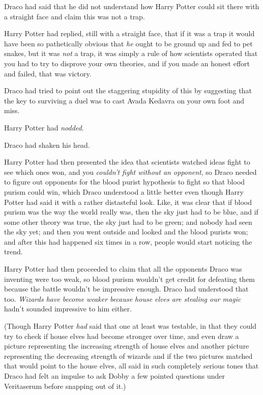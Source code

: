 Draco had said that he did not understand how Harry Potter could sit there with a straight face and claim this was not a trap.

Harry Potter had replied, still with a straight face, that if it was a trap it would have been so pathetically obvious that \emph{he} ought to be ground up and fed to pet snakes, but it was \emph{not} a trap, it was simply a rule of how scientists operated that you had to try to disprove your own theories, and if you made an honest effort and failed, that was victory.

Draco had tried to point out the staggering stupidity of this by suggesting that the key to surviving a duel was to cast Avada Kedavra on your own foot and miss.

Harry Potter had \emph{nodded}.

Draco had shaken his head.

Harry Potter had then presented the idea that scientists watched ideas fight to see which ones won, and you \emph{couldn't fight without an opponent}, so Draco needed to figure out opponents for the blood purist hypothesis to fight so that blood purism could win, which Draco understood a little better even though Harry Potter had said it with a rather distasteful look. Like, it was clear that if blood purism was the way the world really was, then the sky just had to be blue, and if some other theory was true, the sky just had to be green; and nobody had seen the sky yet; and then you went outside and looked and the blood purists won; and after this had happened six times in a row, people would start noticing the trend.

Harry Potter had then proceeded to claim that all the opponents Draco was inventing were too weak, so blood purism wouldn't get credit for defeating them because the battle wouldn't be impressive enough. Draco had understood that too. \emph{Wizards have become weaker because house elves are stealing our magic} hadn't sounded impressive to him either.

(Though Harry Potter \emph{had} said that one at least was testable, in that they could try to check if house elves had become stronger over time, and even draw a picture representing the increasing strength of house elves and another picture representing the decreasing strength of wizards and if the two pictures matched that would point to the house elves, all said in such completely serious tones that Draco had felt an impulse to ask Dobby a few pointed questions under Veritaserum before snapping out of it.)

